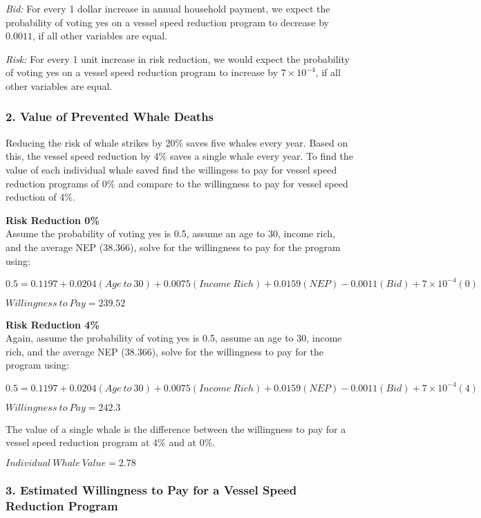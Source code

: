 \documentclass[10pt,]{article}
\begin{document}
\emph{Bid:} For every 1 dollar increase in annual household payment, we
expect the probability of voting yes on a vessel speed reduction program
to decrease by \(0.0011\), if all other variables are equal.

\emph{Risk:} For every 1 unit increase in risk reduction, we would
expect the probability of voting yes on a vessel speed reduction program
to increase by \(7\times 10^{-4}\), if all other variables are equal.

\subsubsection{2. Value of Prevented Whale
Deaths}\label{value-of-prevented-whale-deaths}

Reducing the risk of whale strikes by 20\% saves five whales every year.
Based on this, the vessel speed reduction by 4\% saves a single whale
every year. To find the value of each individual whale saved find the
willingess to pay for vessel speed reduction programs of 0\% and compare
to the willingness to pay for vessel speed reduction of 4\%.

\textbf{Risk Reduction 0\%}\\
Assume the probability of voting yes is 0.5, assume an age to 30, income
rich, and the average NEP (38.366), solve for the willingness to pay for
the program using:

\(0.5 = 0.1197 + 0.0204(Age~to~30) + 0.0075(Income~Rich) + 0.0159(NEP) - 0.0011(Bid) + 7\times 10^{-4}(0)\)

\(Willingness~to~Pay = 239.52\)

\textbf{Risk Reduction 4\%}\\
Again, assume the probability of voting yes is 0.5, assume an age to 30,
income rich, and the average NEP (38.366), solve for the willingness to
pay for the program using:

\(0.5 = 0.1197 + 0.0204(Age~to~30) + 0.0075(Income~Rich) + 0.0159(NEP) - 0.0011(Bid) + 7\times 10^{-4}(4)\)

\(Willingness~to~Pay = 242.3\)

The value of a single whale is the difference between the willingness to
pay for a vessel speed reduction program at 4\% and at 0\%.

\(Individual~Whale~Value = 2.78\)

\subsubsection{3. Estimated Willingness to Pay for a Vessel Speed
Reduction
Program}\label{estimated-willingness-to-pay-for-a-vessel-speed-reduction-program}
\end{document}
